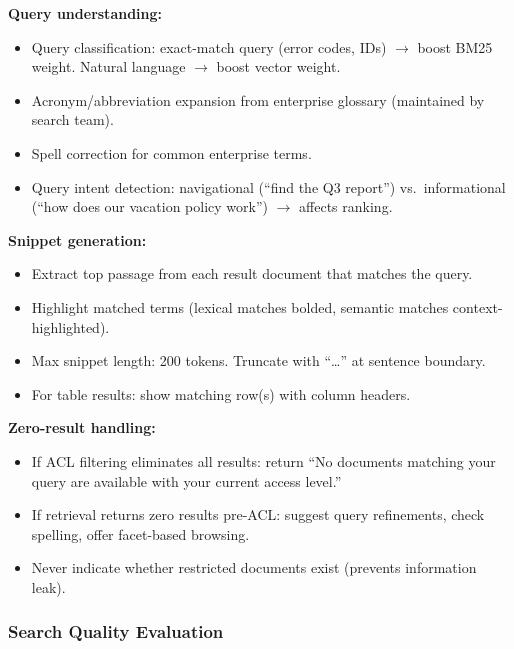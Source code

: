 \textbf{Query understanding:}

\begin{itemize}
  \item Query classification: exact-match query (error codes, IDs) $\rightarrow$ boost BM25 weight. Natural language $\rightarrow$ boost vector weight.
  \item Acronym/abbreviation expansion from enterprise glossary (maintained by search team).
  \item Spell correction for common enterprise terms.
  \item Query intent detection: navigational (``find the Q3 report'') vs.\ informational (``how does our vacation policy work'') $\rightarrow$ affects ranking.
\end{itemize}

\textbf{Snippet generation:}

\begin{itemize}
  \item Extract top passage from each result document that matches the query.
  \item Highlight matched terms (lexical matches bolded, semantic matches context-highlighted).
  \item Max snippet length: 200 tokens. Truncate with ``\ldots'' at sentence boundary.
  \item For table results: show matching row(s) with column headers.
\end{itemize}

\textbf{Zero-result handling:}

\begin{itemize}
  \item If ACL filtering eliminates all results: return ``No documents matching your query are available with your current access level.''
  \item If retrieval returns zero results pre-ACL: suggest query refinements, check spelling, offer facet-based browsing.
  \item Never indicate whether restricted documents exist (prevents information leak).
\end{itemize}

\subsubsection*{Search Quality Evaluation}

